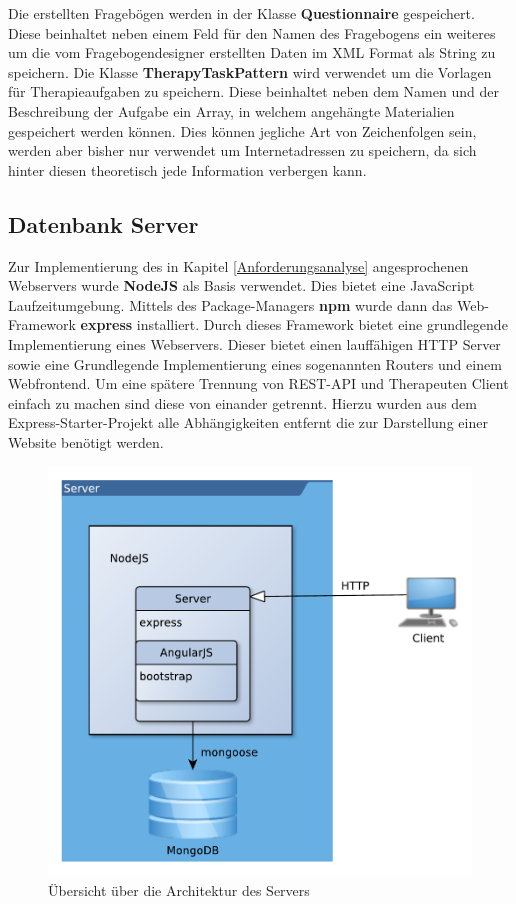 Die erstellten Fragebögen werden in der Klasse \textbf{Questionnaire} gespeichert. Diese beinhaltet neben einem Feld für den Namen des Fragebogens ein weiteres um die vom Fragebogendesigner  erstellten Daten im XML Format als String zu speichern.
Die Klasse \textbf{TherapyTaskPattern} wird verwendet um die Vorlagen für Therapieaufgaben zu speichern. Diese beinhaltet neben dem Namen und der Beschreibung der Aufgabe ein Array, in welchem angehängte Materialien gespeichert werden können. Dies können jegliche Art von Zeichenfolgen sein, werden aber bisher nur verwendet um Internetadressen zu speichern, da sich hinter diesen theoretisch jede Information verbergen kann.

\newpage
\subsection{Datenbank Server} \label{_ImpDatenbankServer}
Zur Implementierung des in Kapitel \ref{Anforderungsanalyse} angesprochenen Webservers wurde \textbf{NodeJS} \cite{NODE16} als Basis verwendet. Dies bietet eine JavaScript Laufzeitumgebung. Mittels des Package-Managers \textbf{npm} wurde dann das Web-Framework \textbf{express} installiert. Durch dieses Framework bietet eine grundlegende Implementierung eines Webservers. Dieser bietet einen lauffähigen HTTP Server sowie eine Grundlegende Implementierung eines sogenannten Routers und einem Webfrontend. Um eine spätere Trennung von REST-API und Therapeuten Client einfach zu machen sind diese von einander getrennt. Hierzu wurden aus dem Express-Starter-Projekt alle Abhängigkeiten entfernt die zur Darstellung einer Website benötigt werden. 

\begin{figure}[H]
	\centering
	\includegraphics[scale=0.7]{images/ServerArchitektur}
	\caption[Übersicht über die Architektur des Servers]{Übersicht über die Architektur des Servers}
	\label{ServerArchitektur}
\end{figure}

